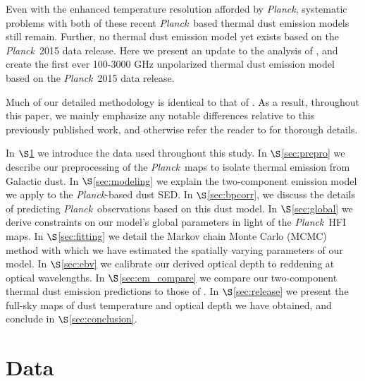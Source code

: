 \documentclass{emulateapj}
\newcommand{\PLANCK}{{\it Planck}}
\begin{document}

Even with the enhanced temperature resolution afforded by \PLANCK, 
systematic problems with both of these recent \PLANCK~based thermal dust 
emission models still remain. Further, no thermal dust emission model yet
exists based on the \PLANCK~2015 data release. Here we present an update
to the analysis of \cite{meisner15}, and create the first ever 100-3000 GHz
unpolarized thermal dust emission model based on the \PLANCK~2015 data release.

Much of our detailed methodology is identical to that of \cite{meisner15}. As a
result, throughout this paper, we mainly emphasize any notable differences 
relative to this previously published work, and otherwise refer the reader to 
\cite{meisner15} for thorough details.

In $\S$\ref{sec:data} we introduce the data used throughout this study. In
$\S$\ref{sec:prepro} we describe our preprocessing of the \PLANCK~maps to
isolate thermal emission from Galactic dust. In $\S$\ref{sec:modeling} we
explain the two-component emission model we apply to the \PLANCK-based dust
SED. In $\S$\ref{sec:bpcorr}, we discuss the details of predicting
\PLANCK~observations based on this dust model. In $\S$\ref{sec:global} we
derive constraints on our model's global parameters in light of the \PLANCK~HFI
maps. In $\S$\ref{sec:fitting} we detail the Markov chain Monte Carlo (MCMC)
method with which we have estimated the spatially varying parameters of our
model. In $\S$\ref{sec:ebv} we calibrate our derived optical depth to reddening
at optical wavelengths. In $\S$\ref{sec:em_compare} we compare our
two-component thermal dust emission predictions to those of \cite{planckdust}.
In $\S$\ref{sec:release} we present the full-sky maps of dust temperature and
optical depth we have obtained, and conclude in $\S$\ref{sec:conclusion}.

\section{Data}
\label{sec:data}
\end{document}
